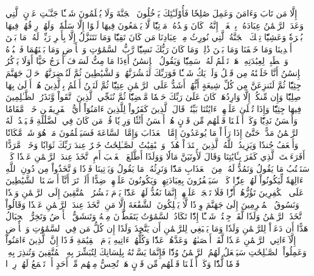 إِلَّا مَن تَابَ وَءَامَنَ وَعَمِلَ صَٰلِحٗا فَأُوْلَـٰٓئِكَ يَدۡخُلُونَ ٱلۡجَنَّةَ وَلَا يُظۡلَمُونَ شَيۡـٔٗا
جَنَّـٰتِ عَدۡنٍ ٱلَّتِي وَعَدَ ٱلرَّحۡمَٰنُ عِبَادَهُۥ بِٱلۡغَيۡبِۚ إِنَّهُۥ كَانَ وَعۡدُهُۥ مَأۡتِيّٗا
لَّا يَسۡمَعُونَ فِيهَا لَغۡوًا إِلَّا سَلَٰمٗاۖ وَلَهُمۡ رِزۡقُهُمۡ فِيهَا بُكۡرَةٗ وَعَشِيّٗا
تِلۡكَ ٱلۡجَنَّةُ ٱلَّتِي نُورِثُ مِنۡ عِبَادِنَا مَن كَانَ تَقِيّٗا
وَمَا نَتَنَزَّلُ إِلَّا بِأَمۡرِ رَبِّكَۖ لَهُۥ مَا بَيۡنَ أَيۡدِينَا وَمَا خَلۡفَنَا وَمَا بَيۡنَ ذَٰلِكَۚ وَمَا كَانَ رَبُّكَ نَسِيّٗا
رَّبُّ ٱلسَّمَٰوَٰتِ وَٱلۡأَرۡضِ وَمَا بَيۡنَهُمَا فَٱعۡبُدۡهُ وَٱصۡطَبِرۡ لِعِبَٰدَتِهِۦۚ هَلۡ تَعۡلَمُ لَهُۥ سَمِيّٗا
وَيَقُولُ ٱلۡإِنسَٰنُ أَءِذَا مَا مِتُّ لَسَوۡفَ أُخۡرَجُ حَيًّا
أَوَلَا يَذۡكُرُ ٱلۡإِنسَٰنُ أَنَّا خَلَقۡنَٰهُ مِن قَبۡلُ وَلَمۡ يَكُ شَيۡـٔٗا
فَوَرَبِّكَ لَنَحۡشُرَنَّهُمۡ وَٱلشَّيَٰطِينَ ثُمَّ لَنُحۡضِرَنَّهُمۡ حَوۡلَ جَهَنَّمَ جِثِيّٗا
ثُمَّ لَنَنزِعَنَّ مِن كُلِّ شِيعَةٍ أَيُّهُمۡ أَشَدُّ عَلَى ٱلرَّحۡمَٰنِ عِتِيّٗا
ثُمَّ لَنَحۡنُ أَعۡلَمُ بِٱلَّذِينَ هُمۡ أَوۡلَىٰ بِهَا صِلِيّٗا
وَإِن مِّنكُمۡ إِلَّا وَارِدُهَاۚ كَانَ عَلَىٰ رَبِّكَ حَتۡمٗا مَّقۡضِيّٗا
ثُمَّ نُنَجِّي ٱلَّذِينَ ٱتَّقَواْ وَّنَذَرُ ٱلظَّـٰلِمِينَ فِيهَا جِثِيّٗا
وَإِذَا تُتۡلَىٰ عَلَيۡهِمۡ ءَايَٰتُنَا بَيِّنَٰتٖ قَالَ ٱلَّذِينَ كَفَرُواْ لِلَّذِينَ ءَامَنُوٓاْ أَيُّ ٱلۡفَرِيقَيۡنِ خَيۡرٞ مَّقَامٗا وَأَحۡسَنُ نَدِيّٗا
وَكَمۡ أَهۡلَكۡنَا قَبۡلَهُم مِّن قَرۡنٍ هُمۡ أَحۡسَنُ أَثَٰثٗا وَرِءۡيٗا
قُلۡ مَن كَانَ فِي ٱلضَّلَٰلَةِ فَلۡيَمۡدُدۡ لَهُ ٱلرَّحۡمَٰنُ مَدًّاۚ حَتَّىٰٓ إِذَا رَأَوۡاْ مَا يُوعَدُونَ إِمَّا ٱلۡعَذَابَ وَإِمَّا ٱلسَّاعَةَ فَسَيَعۡلَمُونَ مَنۡ هُوَ شَرّٞ مَّكَانٗا وَأَضۡعَفُ جُندٗا
وَيَزِيدُ ٱللَّهُ ٱلَّذِينَ ٱهۡتَدَوۡاْ هُدٗىۗ وَٱلۡبَٰقِيَٰتُ ٱلصَّـٰلِحَٰتُ خَيۡرٌ عِندَ رَبِّكَ ثَوَابٗا وَخَيۡرٞ مَّرَدًّا
أَفَرَءَيۡتَ ٱلَّذِي كَفَرَ بِـَٔايَٰتِنَا وَقَالَ لَأُوتَيَنَّ مَالٗا وَوَلَدًا
أَطَّلَعَ ٱلۡغَيۡبَ أَمِ ٱتَّخَذَ عِندَ ٱلرَّحۡمَٰنِ عَهۡدٗا
كَلَّاۚ سَنَكۡتُبُ مَا يَقُولُ وَنَمُدُّ لَهُۥ مِنَ ٱلۡعَذَابِ مَدّٗا
وَنَرِثُهُۥ مَا يَقُولُ وَيَأۡتِينَا فَرۡدٗا
وَٱتَّخَذُواْ مِن دُونِ ٱللَّهِ ءَالِهَةٗ لِّيَكُونُواْ لَهُمۡ عِزّٗا
كَلَّاۚ سَيَكۡفُرُونَ بِعِبَادَتِهِمۡ وَيَكُونُونَ عَلَيۡهِمۡ ضِدًّا
أَلَمۡ تَرَ أَنَّآ أَرۡسَلۡنَا ٱلشَّيَٰطِينَ عَلَى ٱلۡكَٰفِرِينَ تَؤُزُّهُمۡ أَزّٗا
فَلَا تَعۡجَلۡ عَلَيۡهِمۡۖ إِنَّمَا نَعُدُّ لَهُمۡ عَدّٗا
يَوۡمَ نَحۡشُرُ ٱلۡمُتَّقِينَ إِلَى ٱلرَّحۡمَٰنِ وَفۡدٗا
وَنَسُوقُ ٱلۡمُجۡرِمِينَ إِلَىٰ جَهَنَّمَ وِرۡدٗا
لَّا يَمۡلِكُونَ ٱلشَّفَٰعَةَ إِلَّا مَنِ ٱتَّخَذَ عِندَ ٱلرَّحۡمَٰنِ عَهۡدٗا
وَقَالُواْ ٱتَّخَذَ ٱلرَّحۡمَٰنُ وَلَدٗا
لَّقَدۡ جِئۡتُمۡ شَيۡـًٔا إِدّٗا
تَكَادُ ٱلسَّمَٰوَٰتُ يَتَفَطَّرۡنَ مِنۡهُ وَتَنشَقُّ ٱلۡأَرۡضُ وَتَخِرُّ ٱلۡجِبَالُ هَدًّا
أَن دَعَوۡاْ لِلرَّحۡمَٰنِ وَلَدٗا
وَمَا يَنۢبَغِي لِلرَّحۡمَٰنِ أَن يَتَّخِذَ وَلَدًا
إِن كُلُّ مَن فِي ٱلسَّمَٰوَٰتِ وَٱلۡأَرۡضِ إِلَّآ ءَاتِي ٱلرَّحۡمَٰنِ عَبۡدٗا
لَّقَدۡ أَحۡصَىٰهُمۡ وَعَدَّهُمۡ عَدّٗا
وَكُلُّهُمۡ ءَاتِيهِ يَوۡمَ ٱلۡقِيَٰمَةِ فَرۡدًا
إِنَّ ٱلَّذِينَ ءَامَنُواْ وَعَمِلُواْ ٱلصَّـٰلِحَٰتِ سَيَجۡعَلُ لَهُمُ ٱلرَّحۡمَٰنُ وُدّٗا
فَإِنَّمَا يَسَّرۡنَٰهُ بِلِسَانِكَ لِتُبَشِّرَ بِهِ ٱلۡمُتَّقِينَ وَتُنذِرَ بِهِۦ قَوۡمٗا لُّدّٗا
وَكَمۡ أَهۡلَكۡنَا قَبۡلَهُم مِّن قَرۡنٍ هَلۡ تُحِسُّ مِنۡهُم مِّنۡ أَحَدٍ أَوۡ تَسۡمَعُ لَهُمۡ رِكۡزَۢا